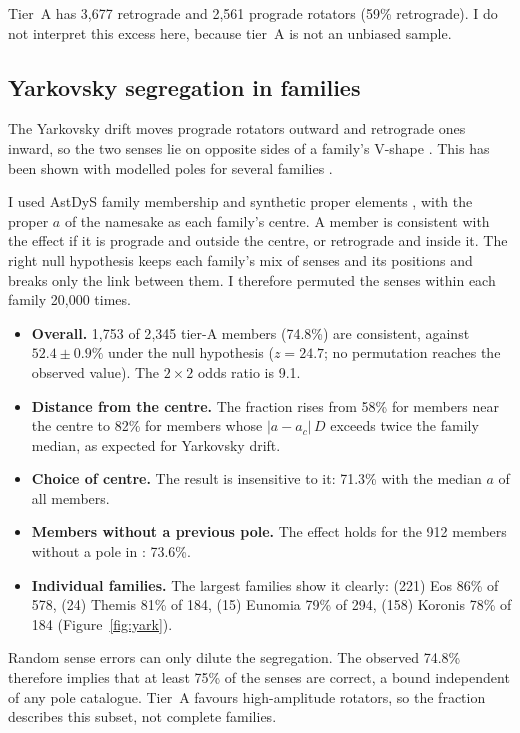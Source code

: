 \documentclass[twocolumn]{aastex631}
\begin{document}
Tier~A has 3{,}677 retrograde and 2{,}561 prograde rotators (59\% retrograde). I do not interpret this
excess here, because tier~A is not an unbiased sample.

\subsection{Yarkovsky segregation in families}

The Yarkovsky drift moves prograde rotators outward and retrograde ones inward, so the two senses lie on
opposite sides of a family's V-shape \citep{Vokrouhlicky2015}. This has been shown with modelled poles
for several families \citep{Hanus2013,Hanus2018,Kryszczynska2013}.

I used AstDyS family membership and synthetic proper elements \citep{Knezevic2003,Milani2014}, with the
proper $a$ of the namesake as each family's centre. A member is consistent with the effect if it is
prograde and outside the centre, or retrograde and inside it. The right null hypothesis keeps each
family's mix of senses and its positions and breaks only the link between them. I therefore permuted the
senses within each family 20{,}000 times.

\begin{itemize}
\item \textbf{Overall.} 1{,}753 of 2{,}345 tier-A members (74.8\%) are consistent, against $52.4\pm0.9\%$
under the null hypothesis ($z=24.7$; no permutation reaches the observed value). The $2\times2$ odds ratio
is 9.1.
\item \textbf{Distance from the centre.} The fraction rises from 58\% for members near the centre to 82\% for
members whose $|a-a_c|\,D$ exceeds twice the family median, as expected for Yarkovsky drift.
\item \textbf{Choice of centre.} The result is insensitive to it: 71.3\% with the median $a$ of all members.
\item \textbf{Members without a previous pole.} The effect holds for the 912 members without a pole in
\citet{Durech2023}: 73.6\%.
\item \textbf{Individual families.} The largest families show it clearly: (221) Eos 86\% of 578, (24) Themis
81\% of 184, (15) Eunomia 79\% of 294, (158) Koronis 78\% of 184 (Figure~\ref{fig:yark}).
\end{itemize}

Random sense errors can only dilute the segregation. The observed 74.8\% therefore implies that at least
75\% of the senses are correct, a bound independent of any pole catalogue. Tier~A favours high-amplitude
rotators, so the fraction describes this subset, not complete families.
\end{document}
